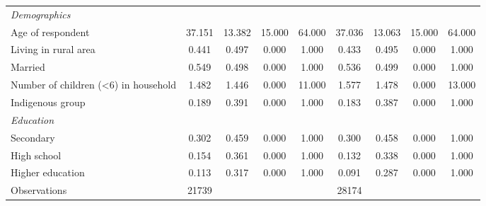 \documentclass[12pt,english,british]{article}
\begin{document}
\begin{table}[h]
\begin{center}
\begin{adjustbox}{max width=\textwidth}
{\begin{tabular}{l*{2}{cccc}}
\hspace*{10mm}\emph{Demographics}&&&&&&&& \\
Age of respondent   &      37.151&      13.382&      15.000&      64.000&      37.036&      13.063&      15.000&      64.000\\
Living in rural area&       0.441&       0.497&       0.000&       1.000&       0.433&       0.495&       0.000&       1.000\\
Married             &       0.549&       0.498&       0.000&       1.000&       0.536&       0.499&       0.000&       1.000\\
Number of children (<6) in household&       1.482&       1.446&       0.000&      11.000&       1.577&       1.478&       0.000&      13.000\\
Indigenous group    &       0.189&       0.391&       0.000&       1.000&       0.183&       0.387&       0.000&       1.000\\
\hspace*{10mm}\emph{Education}&&&&&&&& \\
Secondary           &       0.302&       0.459&       0.000&       1.000&       0.300&       0.458&       0.000&       1.000\\
High school         &       0.154&       0.361&       0.000&       1.000&       0.132&       0.338&       0.000&       1.000\\
Higher education    &       0.113&       0.317&       0.000&       1.000&       0.091&       0.287&       0.000&       1.000\\
\midrule
Observations        &       21739&            &            &            &       28174&            &            &            \\
\bottomrule
\end{tabular}%
}
\end{adjustbox}
\end{center}


\end{table}
\end{document}
